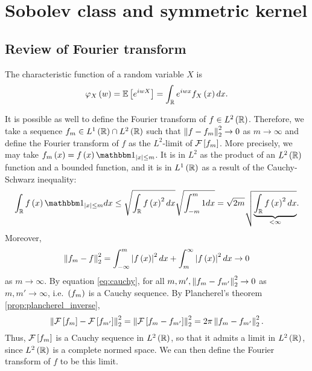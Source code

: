 \section{Sobolev class and symmetric kernel}
\subsection{Review of Fourier transform}
\begin{definition}
	The characteristic function of a random variable $X$ is
	\begin{equation*}
		\varphi_X\left(w\right) = \mathbb{E}\left[e^{iwX}\right] = \int_{\mathbb{R}} e^{iwx} f_X\left(x\right)dx.
	\end{equation*}
\end{definition}

\begin{remark}\label{rem:fourier_l2}
	It is possible as well to define the Fourier transform of $f\in L^2\left(\mathbb{R}\right)$. Therefore, we take a sequence $f_m \in L^1\left(\mathbb{R}\right)\cap L^2\left(\mathbb{R}\right)$ such that $\left\| f-f_m \right\|^2_2\rightarrow 0$ as $m\rightarrow \infty$ and define the Fourier transform of $f$ as the $L^2$-limit of $\mathcal{F} \left[f_m\right]$. More precisely, we may take $f_m\pa{x} = f\pa{x} \one_{\abs{x}\leq m}$. It is in $L^2$ as the product of an $L^2\left(\mathbb{R}\right)$ function and a bounded function, and it is in $L^1\left(\mathbb{R}\right)$ as a result of the Cauchy-Schwarz inequality:
	\begin{equation*}
		\int_{\R} f\pa{x} \one_{\abs{x}\leq m} dx \leq \sqrt{\int_{\R} f\pa{x}^2 dx } \sqrt{\int_{-m}^m 1 dx } = \sqrt{2m}  \sqrt{\underbrace{\int_{\R} f\pa{x}^2 dx}_{<\infty} }.
	\end{equation*}
	Moreover,
	\begin{equation}\label{eq:cauchy}
		\left\| f_m -f \right\|^2_2 = \int_{-\infty}^m \left| f\left(x\right)\right|^2 dx + \int_m^\infty \left| f\left(x\right)\right|^2 dx \rightarrow 0
	\end{equation}
	as $m\rightarrow \infty$.
	By equation \ref{eq:cauchy}, for all $m,m', \left\| f_m -f_{m'} \right\|_2^2\rightarrow
		0$ as $m,m'\rightarrow \infty$, i.e.~$\left(f_m\right)$ is a Cauchy sequence. By
	Plancherel's theorem \ref{prop:plancherel_inverse},
	\begin{equation*}
		\left\| \mathcal{F} \left[f_m\right] -\mathcal{F}\left[f_{m'}\right]  \right\|_2^2 = \left\| \mathcal{F} \left[f_m -f_{m'} \right] \right\|_2^2 = 2\pi \left\| f_m -f_{m'} \right\|_2^2.
	\end{equation*}
	Thus, $\mathcal{F}\left[f_m\right]$ is a Cauchy sequence in $L^2\left(\mathbb{R}\right)$, so that it admits a limit in $L^2\left(\mathbb{R}\right)$, since $L^2\left(\mathbb{R}\right)$ is a complete normed space. We can then define the Fourier transform of $f$ to be this limit.
\end{remark}
